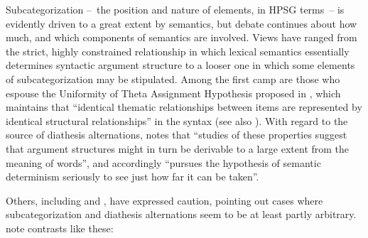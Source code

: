 \documentclass[output=paper
 	        ,biblatex
                ,babelshorthands
                ,newtxmath
                ,draftmode
                ,colorlinks, citecolor=brown
]{langscibook}
\begin{document}
Subcategorization --~the position and nature of \argst elements, in HPSG terms~-- is evidently driven to a great extent by semantics,
but debate continues about how much, and which components of semantics are involved.
Views have ranged from the strict, highly constrained relationship in which lexical semantics essentially determines syntactic argument structure to a looser one in which some elements of subcategorization may be stipulated.
Among  the first camp are those who espouse the Uniformity of Theta Assignment
Hypothesis  proposed in \citet[46]{Baker1988}, which maintains that ``identical thematic relationships between items are represented by identical structural relationships'' in the syntax (see also \citealt{Baker1997}).
With regard to the source of diathesis alternations,
\citet[12--13]{Levin1993} notes that ``studies of these properties suggest that argument structures
might in turn be derivable to a large extent from the meaning of words'', and accordingly ``pursues
the hypothesis of semantic determinism seriously to see just how far it can be taken''. 

Others, including \citet[Section~5.3]{pollard+sag:1987} and \citet[Section~5.1]{Davis2001}, have
expressed caution, pointing out cases where subcategorization and diathesis
alternations seem to be at least partly arbitrary. \citet[ex.\ 214--215]{pollard+sag:1987} note contrasts like these:
\end{document}
